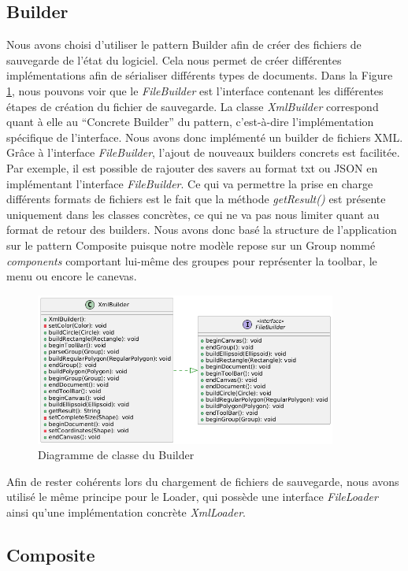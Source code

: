 \documentclass{article}
\begin{document}
\subsection{Builder}
Nous avons choisi d'utiliser le pattern Builder afin de créer des fichiers de sauvegarde de l'état du logiciel. Cela nous permet de créer différentes implémentations
afin de sérialiser différents types de documents. Dans la Figure \ref{Builder}, nous pouvons voir que le \textit{FileBuilder} est l'interface contenant les différentes étapes de création
du fichier de sauvegarde. La classe \textit{XmlBuilder} correspond quant à elle au ``Concrete Builder'' du pattern, c'est-à-dire l'implémentation spécifique
de l'interface. Nous avons donc implémenté un builder de fichiers XML. Grâce à l'interface \textit{FileBuilder}, l'ajout de nouveaux builders concrets est facilitée.
Par exemple, il est possible de rajouter des savers au format txt ou JSON en implémentant l'interface \textit{FileBuilder}.
Ce qui va permettre la prise en charge différents formats de fichiers est le fait que la méthode \textit{getResult()} est présente uniquement dans les classes concrètes, ce qui ne va pas nous
limiter quant au format de retour des builders. Nous avons donc basé la structure de l'application sur le pattern Composite puisque notre modèle repose sur un Group nommé \textit{components}
comportant lui-même des groupes pour représenter la toolbar, le menu ou encore le canevas.

\begin{figure}[h]
    \centering
    \includegraphics[width=\textwidth,height=5.0cm,keepaspectratio]{builder.png}
    \caption{Diagramme de classe du Builder}
    \label{Builder}
\end{figure}
\FloatBarrier

Afin de rester cohérents lors du chargement de fichiers de sauvegarde, nous avons utilisé le même principe pour le Loader,
qui possède une interface \textit{FileLoader} ainsi qu'une implémentation concrète \textit{XmlLoader}.

\subsection{Composite}
\end{document}
